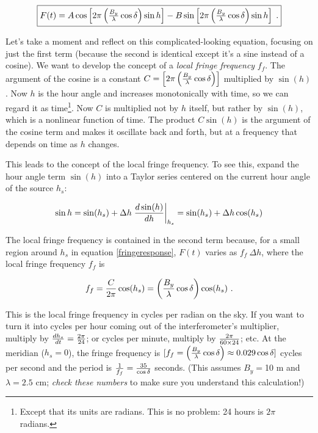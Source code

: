 \documentclass[11pt,preprint]{aastex}
\begin{document}
\begin{equation} \fbox{$
\label{fringeresponse}
 F(t) = A \cos \left[2 \pi \left( {B_y \over \lambda} \cos\delta \right) \sin h\right] 
 - B \sin \left[2 \pi \left( {B_y \over \lambda} \cos\delta \right) \sin h\right] \; . 
$}
\end{equation}

	Let's take a moment and reflect on this complicated-looking
equation, focusing on just the first term (because the second is
identical except it's a sine instead of a cosine). We want to develop
the concept of a {\it local fringe frequency} $f_f$. The argument of the
cosine is a constant $C=\left[2 \pi \left( {B_y \over \lambda}
\cos\delta \right)\right]$ multiplied by $\sin( h)$. Now $h$ is the hour
angle and increases monotonically with time, so we can regard it as
time\footnote{Except that its units are radians. This is no problem: 24
hours is $2\pi$ radians.}. Now $C$ is multiplied not by $h$ itself, but
rather by $\sin( h)$, which is a nonlinear function of time. The product
$C \sin(h)$ is the argument of the cosine term and makes it oscillate
back and forth, but at a frequency that depends on time as $h$ changes. 

	This leads to the concept of the local fringe frequency. To see
this, expand the hour angle term $\sin (h)$ into a Taylor series
centered on the current hour angle of the source $h_s$:

\begin{equation} \label{taylorexpansion}
\sin h = \sin( h_s) + 
  \Delta h \left. {d \sin(h) \over dh}\right|_{h_s} = 
\sin( h_s) + \Delta h \cos( h_s) 
\end{equation}

\noindent The local fringe frequency is contained in the second term
because, for a small region around $h_s$ in equation
\ref{fringeresponse}, $F(t)$ varies as $f_f \ \Delta h$, where  the
local fringe frequency $f_f$ is

\begin{equation} \label{fringefreq}
f_f = {C \over 2\pi}  \cos(h_s) = \left( {B_y \over \lambda} \cos\delta
\right) \cos( h_s) \ .
\end{equation}

\noindent This is the local fringe frequency in cycles per radian on the
sky. If you want to turn it into cycles per hour coming out of the
interferometer's multiplier, multiply by ${dh_s \over dt} = {2\pi \over
24}$; or cycles per minute, multiply by $2\pi \over 60 \times 24$;
etc. At the meridian ($h_s=0$), the fringe frequency is $[f_f =
\left({B_y \over \lambda} \cos{\delta} \right) \approx 0.029 \cos
\delta]$ cycles per second and the period is ${1 \over f_f} = {35 \over
\cos \delta}$ seconds. (This assumes $B_y=$10 m and $\lambda=2.5$ cm;
{\it check these numbers} to make sure you understand this calculation!)
\end{document}
